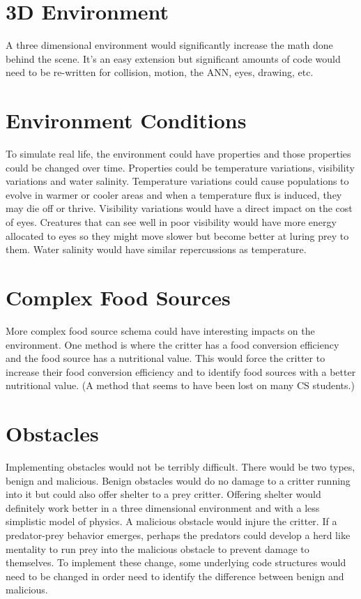 \section{3D Environment} 
A three dimensional environment would significantly increase the math done behind the scene. It's an easy extension but significant amounts of code would need to be re-written for collision, motion, the ANN, eyes, drawing, etc.\\

\section{Environment Conditions}
To simulate real life, the environment could have properties and those properties could be changed over time. Properties could be temperature variations, visibility variations and water salinity. Temperature variations could cause populations to evolve in warmer or cooler areas and when a temperature flux is induced, they may die off or thrive. Visibility variations would have a direct impact on the cost of eyes. Creatures that can see well in poor visibility would have more energy allocated to eyes so they might move slower but become better at luring prey to them. Water salinity would have similar repercussions as temperature.\\


\section{Complex Food Sources}
More complex food source schema could have interesting impacts on the environment. One method is where the critter has a food conversion efficiency and the food source has a nutritional value. This would force the critter to increase their food conversion efficiency and to identify food sources with a better nutritional value. (A method that seems to have been lost on many CS students.) \\

\section{Obstacles}
Implementing obstacles would not be terribly difficult. There would be two types, benign and malicious. Benign obstacles would do no damage to a critter running into it but could also offer shelter to a prey critter. Offering shelter would definitely work better in a three dimensional environment and with a less simplistic model of physics. A malicious obstacle would injure the critter. If a predator-prey behavior emerges, perhaps the predators could develop a herd like mentality to run prey into the malicious obstacle to prevent damage to themselves. To implement these change, some underlying code structures would need to be changed in order need to identify the difference between benign and malicious. \\


